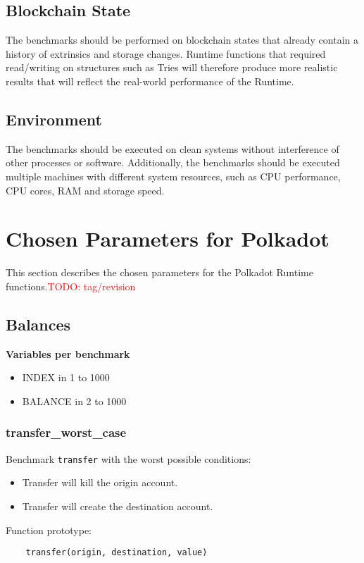 \documentclass[11pt,a4paper]{article}
\newcommand{\todo}[1]{\textcolor{red}{TODO: #1}}
\begin{document}
\subsection{Blockchain State}
The benchmarks should be performed on blockchain states that already contain a history of
extrinsics and storage changes. Runtime functions that required read/writing on structures
such as Tries will therefore produce more realistic results that will reflect the real-world
performance of the Runtime.

\subsection{Environment}
The benchmarks should be executed on clean systems without interference of other processes
or software. Additionally, the benchmarks should be executed multiple machines with different
system resources, such as CPU performance, CPU cores, RAM and storage speed.

\section{Chosen Parameters for Polkadot}
This section describes the chosen parameters for the Polkadot Runtime functions.\todo{tag/revision}

\subsection{Balances}

\textbf{Variables per benchmark}
\begin{itemize}
\item INDEX in 1 to 1000
\item BALANCE in 2 to 1000
\end{itemize}

\subsubsection{transfer\_worst\_case}

Benchmark \verb|transfer| with the worst possible conditions:
\begin{itemize}
\item Transfer will kill the origin account.
\item Transfer will create the destination account.
\end{itemize}

Function prototype:

\begin{verbatim}
    transfer(origin, destination, value)
\end{verbatim}
\end{document}
